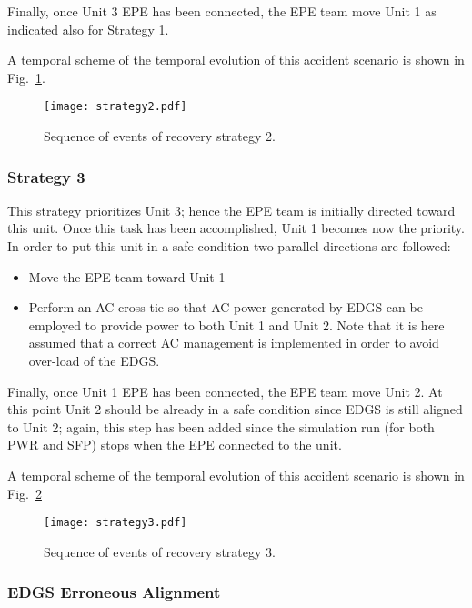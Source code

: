 Finally, once Unit 3 EPE has been connected, the EPE team move Unit 1 as indicated also for Strategy 1.

A temporal scheme of the temporal evolution of this accident scenario is shown in Fig.~\ref{fig:strategy2Scheme}.  

\begin{figure}
    \centering
    \centerline{\texttt{[image: strategy2.pdf]}}
    \caption{Sequence of events of recovery strategy 2.}
    \label{fig:strategy2Scheme}
\end{figure}

\subsubsection{Strategy 3}
\label{sec:strategy3}

This strategy prioritizes Unit 3; hence the EPE team is initially directed toward this unit. 
Once this task has been accomplished, Unit 1 becomes now the priority. In order to put this unit in a safe 
condition two parallel directions are followed: 

\begin{itemize}
  \item Move the EPE team toward Unit 1 
  \item Perform an AC cross-tie so that AC power generated by EDGS can be employed to provide power to both Unit
        1 and Unit 2. Note that it is here assumed that a correct AC management is implemented in order to avoid
        over-load of the EDGS.
\end{itemize}

Finally, once Unit 1 EPE has been connected, the EPE team move Unit 2. At this point Unit 2 should be already in a 
safe condition since EDGS is still aligned to Unit 2; again, this step has been added since the simulation run (for 
both PWR and SFP) stops when the EPE connected to the unit.

A temporal scheme of the temporal evolution of this accident scenario is shown in Fig.~\ref{fig:strategy3Scheme}

\begin{figure}
    \centering
    \centerline{\texttt{[image: strategy3.pdf]}}
    \caption{Sequence of events of recovery strategy 3.}
    \label{fig:strategy3Scheme}
\end{figure}

\subsubsection{EDGS Erroneous Alignment}
\label{sec:EDGSinvolAlign}

